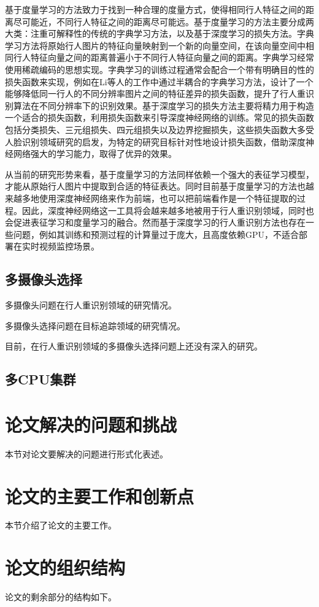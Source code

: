 基于度量学习的方法致力于找到一种合理的度量方式，使得相同行人特征之间的距离尽可能近，不同行人特征之间的距离尽可能远。基于度量学习的方法主要分成两大类：注重可解释性的传统的字典学习方法，以及基于深度学习的损失方法。字典学习方法将原始行人图片的特征向量映射到一个新的向量空间，在该向量空间中相同行人特征向量之间的距离普遍小于不同行人特征向量之间的距离。字典学习经常使用稀疏编码\cite{lee2007efficient}的思想实现。字典学习的训练过程通常会配合一个带有明确目的性的损失函数来实现，例如在Li等人\cite{li2018discriminative}的工作中通过半耦合的字典学习方法，设计了一个能够降低同一行人的不同分辨率图片之间的特征差异的损失函数，提升了行人重识别算法在不同分辨率下的识别效果。基于深度学习的损失方法主要将精力用于构造一个适合的损失函数，利用损失函数来引导深度神经网络的训练。常见的损失函数包括分类损失、三元组损失\cite{schroff2015facenet}、四元组损失\cite{chen2017beyond}以及边界挖掘损失\cite{xiao2017margin}，这些损失函数大多受人脸识别领域研究的启发，为特定的研究目标针对性地设计损失函数，借助深度神经网络强大的学习能力，取得了优异的效果。

从当前的研究形势来看，基于度量学习的方法同样依赖一个强大的表征学习模型，才能从原始行人图片中提取到合适的特征表达。同时目前基于度量学习的方法也越来越多地使用深度神经网络来作为前端，也可以把前端看作是一个特征提取的过程。因此，深度神经网络这一工具将会越来越多地被用于行人重识别领域，同时也会促进表征学习和度量学习的融合。然而基于深度学习的行人重识别方法也存在一些问题，例如其训练和预测过程的计算量过于庞大，且高度依赖GPU，不适合部署在实时视频监控场景。

\subsection{多摄像头选择}

多摄像头问题在行人重识别领域的研究情况。

多摄像头选择问题在目标追踪领域的研究情况。

目前，在行人重识别领域的多摄像头选择问题上还没有深入的研究。

\subsection{多CPU集群}

\section{论文解决的问题和挑战}
本节对论文要解决的问题进行形式化表述。

\section{论文的主要工作和创新点}
本节介绍了论文的主要工作。

\section{论文的组织结构}
论文的剩余部分的结构如下。